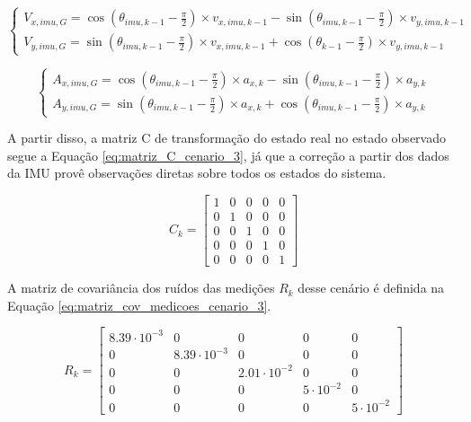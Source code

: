 \documentclass[acronym, symbols, table]{fei}
\begin{document}
			\begin{equation}\label{eq:calculo_velocidades_globais_imu}
				\begin{cases}
					V_{x,imu,G} = \cos(\theta_{imu,k-1} - \frac{\pi}{2}) \times v_{x,imu,k-1} - \sin(\theta_{imu,k-1} - \frac{\pi}{2}) \times v_{y,imu,k-1} \\
					V_{y,imu,G} = \sin(\theta_{imu,k-1} - \frac{\pi}{2}) \times v_{x,imu,k-1} + \cos(\theta_{k-1} - \frac{\pi}{2}) \times v_{y,imu,k-1}
				\end{cases}
			\end{equation}
		
			\begin{equation}\label{eq:calculo_aceleracoes_globais_imu}
				\begin{cases}
					A_{x,imu,G} = \cos(\theta_{imu,k-1} - \frac{\pi}{2}) \times a_{x,k} - \sin(\theta_{imu,k-1} - \frac{\pi}{2}) \times a_{y,k} \\
					A_{y,imu,G} = \sin(\theta_{imu,k-1} - \frac{\pi}{2}) \times a_{x,k} + \cos(\theta_{imu,k-1} - \frac{\pi}{2}) \times a_{y,k}
				\end{cases}
			\end{equation}
		
			A partir disso, a matriz C de transformação do estado real no estado observado segue a Equação \ref{eq:matriz_C_cenario_3}, já que a correção a partir dos dados da IMU provê observações diretas sobre todos os estados do sistema.
			
			\begin{equation}\label{eq:matriz_C_cenario_3}
				C_{k} = \begin{bmatrix}
					1 & 0 & 0 & 0 & 0 \\
					0 & 1 & 0 & 0 & 0 \\
					0 & 0 & 1 & 0 & 0 \\
					0 & 0 & 0 & 1 & 0 \\
					0 & 0 & 0 & 0 & 1
				\end{bmatrix}
			\end{equation}
		
			A matriz de covariância dos ruídos das medições $R_{k}$ desse cenário é definida na Equação \ref{eq:matriz_cov_medicoes_cenario_3}.
			
			\begin{equation}\label{eq:matriz_cov_medicoes_cenario_3}
				R_{k} = \begin{bmatrix}
					8.39\cdot10^{-3} & 0 & 0 & 0 & 0 \\
					0 & 8.39\cdot10^{-3} & 0 & 0 & 0 \\
					0 & 0 & 2.01\cdot10^{-2} & 0 & 0 \\
					0 & 0 & 0 & 5\cdot10^{-2} & 0 \\
					0 & 0 & 0 & 0 & 5\cdot10^{-2}
				\end{bmatrix}
			\end{equation}
		
\end{document}
